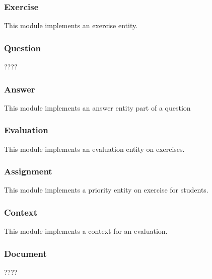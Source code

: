 		\subsubsection{Exercise} 
			This module implements an exercise entity.
		\subsubsection{Question}
			????
		\subsubsection{Answer}
			This module implements an answer entity part of a question
		\subsubsection{Evaluation}
			This module implements an evaluation entity on exercises.
		\subsubsection{Assignment}
			This module implements a priority entity on exercise for students.
		\subsubsection{Context}
			This module implements a context for an evaluation.
		\subsubsection{Document}
			????
